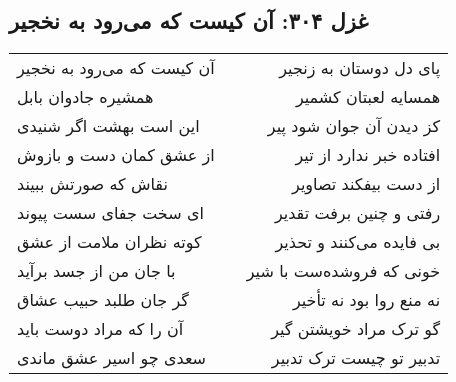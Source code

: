 \begin{center}
\section*{غزل ۳۰۴: آن کیست که می‌رود به نخجیر}
\label{sec:304}
\begin{longtable}{l p{0.5cm} r}
آن کیست که می‌رود به نخجیر
&&
پای دل دوستان به زنجیر
\\
همشیره جادوان بابل
&&
همسایه لعبتان کشمیر
\\
این است بهشت اگر شنیدی
&&
کز دیدن آن جوان شود پیر
\\
از عشق کمان دست و بازوش
&&
افتاده خبر ندارد از تیر
\\
نقاش که صورتش ببیند
&&
از دست بیفکند تصاویر
\\
ای سخت جفای سست پیوند
&&
رفتی و چنین برفت تقدیر
\\
کوته نظران ملامت از عشق
&&
بی فایده می‌کنند و تحذیر
\\
با جان من از جسد برآید
&&
خونی که فروشده‌ست با شیر
\\
گر جان طلبد حبیب عشاق
&&
نه منع روا بود نه تأخیر
\\
آن را که مراد دوست باید
&&
گو ترک مراد خویشتن گیر
\\
سعدی چو اسیر عشق ماندی
&&
تدبیر تو چیست ترک تدبیر
\\
\end{longtable}
\end{center}

